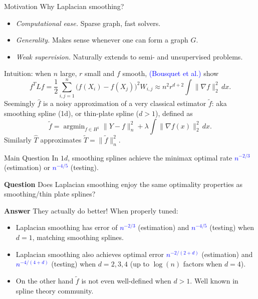 \documentclass{beamer}
\newcommand{\wh}[1]{\widehat{#1}}
\newcommand{\wt}[1]{\widetilde{#1}}
\DeclareMathOperator*{\argmin}{argmin}
\newcommand{\blue}[1]{\textcolor{blue}{#1}}
\begin{document}
\begin{frame}{Motivation}
Why Laplacian smoothing?
\begin{itemize}
	\item \emph{Computational ease.} Sparse graph, fast solvers.
	\item \emph{Generality.} Makes sense whenever one can form a graph $G$. 
	\item \emph{Weak supervision.} Naturally extends to semi- and unsupervised problems.
\end{itemize}
Intuition: when $n$ large, $r$ small and $f$ smooth, \textcolor{blue}{(Bousquet et al.)} show
\begin{equation*}
f^T L f = \frac{1}{2}\sum_{i,j = 1}^{n} \bigl(f(X_i) - f(X_j)\bigr)^2 W_{i,j} \approx n^2 r^{d + 2} \int \|\nabla f\|_2^2 \,dx.
\end{equation*}
Seemingly $\wh{f}$ is a noisy approximation of a very classical estimator $\wt{f}$: aka \alert{smoothing spline} (1d), or \alert{thin-plate spline} ($d > 1$), defined as
\begin{equation*}
\widetilde{f} = \argmin_{f \in H^1} \|Y - f\|_n^2 + \lambda \int \|\nabla f(x)\|_2^2 \,dx.
\end{equation*}
Similarly $\wh{T}$ approximates $\wt{T} = \|\wt{f}\|_n^2$. 
\end{frame}

\begin{frame}{Main Question}
In $1d$, smoothing splines achieve the minimax optimal rate \blue{$n^{-2/3}$} (estimation) or \blue{$n^{-4/5}$} (testing).
\begin{block}{{\bf Question}}
	Does Laplacian smoothing enjoy the same optimality properties as smoothing/thin plate splines?
\end{block}

\begin{block}{{\bf Answer}}
	They actually do better! When properly tuned:
	\begin{itemize}
		\item Laplacian smoothing has error of \blue{$n^{-2/3}$} (estimation) and \blue{$n^{-4/5}$} (testing) when $d = 1$, matching smoothing splines.
		\item Laplacian smoothing also achieves optimal error \blue{$n^{-2/(2 + d)}$} (estimation) and \blue{$n^{-4/(4 + d)}$} (testing) when $d = 2,3,4$ (up to $\log(n)$ factors when $d = 4$).
		\item On the other hand $\wt{f}$ is \alert{not even well-defined} when $d > 1$. Well known in spline theory community.
	\end{itemize}
\end{block}
\end{frame}
\end{document}
